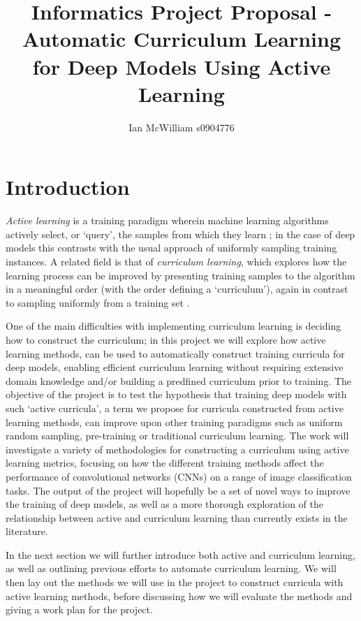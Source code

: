 \documentclass[a4paper,11pt]{article}
\begin{document}
\title{Informatics Project Proposal - Automatic Curriculum Learning for Deep Models Using Active Learning}
\author{Ian McWilliam s0904776}
\date{}
\maketitle


\section{Introduction}
\textit{Active learning} is a training paradigm wherein machine learning algorithms actively select, or `query', the samples from which they learn \cite{Settles 2009}; in the case of deep models this contrasts with the usual approach of uniformly sampling training instances. A related field is that of \textit{curriculum learning}, which explores how the learning process can be improved by presenting training samples to the algorithm in a meaningful order (with the order defining a `curriculum'), again in contrast to sampling uniformly from a training set \cite{Bengio 09}.

One of the main difficulties with implementing curriculum learning is deciding how to construct the curriculum\cite{Bengio 09}; in this project we will explore how active learning methods, can be used to automatically construct training curricula for deep models, enabling efficient curriculum learning without requiring extensive domain knowledge and/or building a predfined curriculum prior to training. The objective of the project is to test the hypothesis that training deep models with such `active curricula', a term we propose for curricula constructed from active learning methods, can improve upon other training paradigms such as uniform random sampling, pre-training or traditional curriculum learning. The work will investigate a variety of methodologies for constructing a curriculum using active learning metrics, focusing on how the different training methods affect the performance of convolutional networks (CNNs) on a range of image classification tasks. The output of the project will hopefully be a set of novel ways to improve the training of deep models, as well as a more thorough exploration of the relationship between active and curriculum learning than currently exists in the literature.

In the next section we will further introduce both active and curriculum learning, as well as outlining previous efforts to automate curriculum learning. We will then lay out the methods we will use in the project to construct curricula with active learning methods, before discussing how we will evaluate the methods and giving a work plan for the project.
\end{document}
